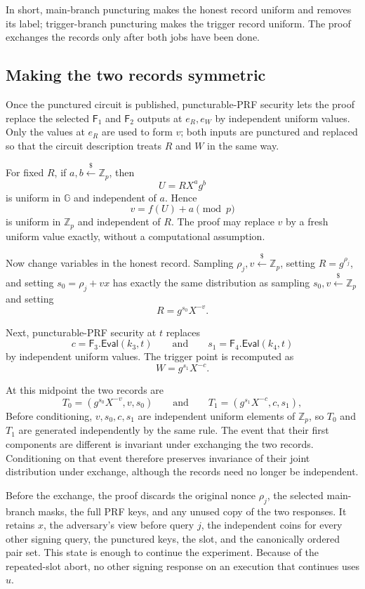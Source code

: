 \documentclass[11pt]{article}
\newcommand{\Zp}{\mathbb{Z}_p}
\newcommand{\getsr}{\mathrel{\mathop{\leftarrow}\limits^{\$}}}
\newcommand{\Eval}{\mathsf{Eval}}
\begin{document}
In short, main-branch puncturing makes the honest record uniform and removes
its label; trigger-branch puncturing makes the trigger record uniform.  The
proof exchanges the records only after both jobs have been done.

\subsection{Making the two records symmetric}

Once the punctured circuit is published, puncturable-PRF security lets the
proof replace the selected \(\mathsf{F}_1\) and \(\mathsf{F}_2\) outputs at
\(e_R,e_W\) by independent uniform values.  Only the values at \(e_R\) are
used to form \(v\); both inputs are punctured and replaced so that the
circuit description treats \(R\) and \(W\) in the same way.

For fixed \(R\), if \(a,b\getsr\Zp\), then
\[
  U=RX^a g^b
\]
is uniform in \(\mathbb{G}\) and independent of \(a\).  Hence
\[
  v=f(U)+a\pmod p
\]
is uniform in \(\Zp\) and independent of \(R\).  The proof may replace \(v\)
by a fresh uniform value exactly, without a computational assumption.

Now change variables in the honest record.  Sampling
\(\rho_j,v\getsr\Zp\), setting \(R=g^{\rho_j}\), and setting
\(s_0=\rho_j+vx\) has exactly the same distribution as sampling
\(s_0,v\getsr\Zp\) and setting
\[
  R=g^{s_0}X^{-v}.
\]

Next, puncturable-PRF security at \(t\) replaces
\[
  c=\mathsf{F}_3.\Eval(k_3,t)
  \qquad\text{and}\qquad
  s_1=\mathsf{F}_4.\Eval(k_4,t)
\]
by independent uniform values.  The trigger point is recomputed as
\[
  W=g^{s_1}X^{-c}.
\]

At this midpoint the two records are
\[
  T_0=(g^{s_0}X^{-v},v,s_0)
  \qquad\text{and}\qquad
  T_1=(g^{s_1}X^{-c},c,s_1),
\]
Before conditioning, \(v,s_0,c,s_1\) are independent uniform elements of
\(\Zp\), so \(T_0\) and \(T_1\) are generated independently by the same
rule.  The event that their first components are different is invariant under
exchanging the two records.  Conditioning on that event therefore preserves
invariance of their joint distribution under exchange, although the records
need no longer be independent.

Before the exchange, the proof discards the original nonce \(\rho_j\), the
selected main-branch masks, the full PRF keys, and any unused copy of the two
responses.  It retains \(x\), the adversary's view before query \(j\), the
independent coins for every other signing query, the punctured keys, the
slot, and the canonically ordered pair set.  This state is enough to continue
the experiment.  Because of the repeated-slot abort, no other signing
response on an execution that continues uses \(u\).
\end{document}
